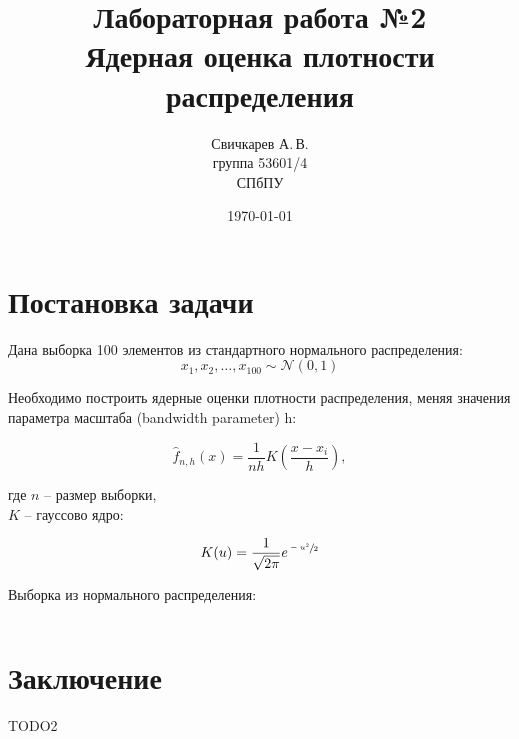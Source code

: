 \documentclass{article} %
\title{Лабораторная работа №2\\Ядерная оценка плотности распределения} %
\author{Свичкарев А.\,В.\\группа 53601/4\\СПбПУ} %
\date{\today} %
\begin{document}

\maketitle %

\section{Постановка задачи}
Дана выборка 100 элементов из стандартного нормального \mbox{распределения}:
\[x_1,x_2,\dotsc,x_{100}\sim\mathcal{N}(0,1)\]

Необходимо построить ядерные оценки плотности распределения, меняя значения параметра масштаба (bandwidth parameter) h:

\[\hat{f}_{n,h}(x) = \frac{1}{nh}K{\left(\frac{x-x_i}{h}\right)},\]

где $n$ -- размер выборки,\\
\indent $K$ -- гауссово ядро:

\[K(u) = \frac{1}{\sqrt{2\pi}}e^{\sfrac{-u^2}{2}}\]

Выборка из нормального распределения:
\\\newline
\begin{Verbatim}

\end{Verbatim}

\section{Заключение}
TODO2
\end{document}
